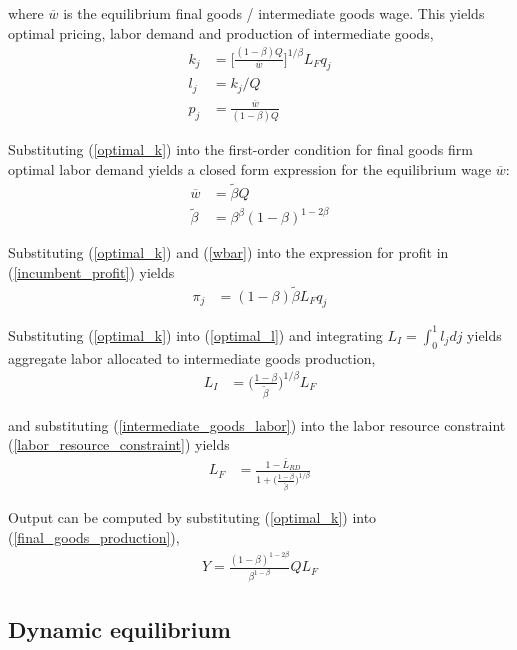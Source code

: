 \documentclass[12pt,english]{article}
\theoremstyle{remark}
\begin{document}
where $\overline{w}$ is the equilibrium final goods / intermediate goods wage.
This yields optimal pricing, labor demand and production of intermediate goods,
\begin{align}
k_j &= \Big[ \frac{(1-\beta) Q}{\overline{w}} \Big]^{1/\beta}L_F q_j  \label{optimal_k}\\
l_j &= k_j / Q \label{optimal_l}\\
p_j &= \frac{\overline{w}}{(1-\beta) Q} \label{optimal_p}
\end{align}

Substituting (\ref{optimal_k}) into the first-order condition for final goods firm optimal labor demand yields a closed form expression for the equilibrium wage $\overline{w}$:
\begin{align}
\overline{w} &= \tilde{\beta} Q \label{wbar} \\
\tilde{\beta} &= \beta^{\beta} (1-\beta)^{1-2\beta} \label{def_cbeta}
\end{align}

Substituting (\ref{optimal_k}) and (\ref{wbar}) into the expression for profit in (\ref{incumbent_profit}) yields
\begin{align}
\pi_j &= (1-\beta) \tilde{\beta} L_F q_j \label{profits_eq}
\end{align}

Substituting (\ref{optimal_k}) into (\ref{optimal_l}) and integrating $L_I = \int_0^1 l_j dj$ yields aggregate labor allocated to intermediate goods production,
\begin{align}
L_I &= \Big( \frac{1-\beta}{\tilde{\beta}} \Big)^{1 / \beta} L_F \label{intermediate_goods_labor}
\end{align}

and substituting (\ref{intermediate_goods_labor}) into the labor resource constraint (\ref{labor_resource_constraint}) yields
\begin{align}
L_F &= \frac{1 - \bar{L}_{RD}}{1 + \Big(\frac{1-\beta}{\tilde{\beta}}\Big)^{1/\beta}}
\end{align}

Output can be computed by substituting (\ref{optimal_k}) into (\ref{final_goods_production}), 
\begin{align}
Y = \frac{(1-\beta)^{1-2\beta}}{\beta^{1-\beta}} Q L_F \label{flow_output}
\end{align}

\subsection{Dynamic equilibrium}
\end{document}
